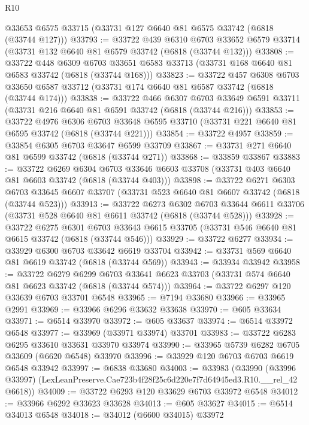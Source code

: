 \begin{lexlean}{R10}
\begin{coremodule}
    @33653
    @6575
    @33715
    (@33731 @127 @6640 @81 @6575 @33742 (@6818 (@33744 @127)))
@33793 := @33722
    @439
    @6310
    @6703
    @33652
    @6579
    @33714
    (@33731 @132 @6640 @81 @6579 @33742 (@6818 (@33744 @132)))
@33808 := @33722
    @448
    @6309
    @6703
    @33651
    @6583
    @33713
    (@33731 @168 @6640 @81 @6583 @33742 (@6818 (@33744 @168)))
@33823 := @33722
    @457
    @6308
    @6703
    @33650
    @6587
    @33712
    (@33731 @174 @6640 @81 @6587 @33742 (@6818 (@33744 @174)))
@33838 := @33722
    @466
    @6307
    @6703
    @33649
    @6591
    @33711
    (@33731 @216 @6640 @81 @6591 @33742 (@6818 (@33744 @216)))
@33853 := @33722
    @4976
    @6306
    @6703
    @33648
    @6595
    @33710
    (@33731 @221 @6640 @81 @6595 @33742 (@6818 (@33744 @221)))
@33854 := @33722 @4957
@33859 := @33854 @6305 @6703 @33647 @6599 @33709
@33867 := @33731 @271 @6640 @81 @6599 @33742 (@6818 (@33744 @271))
@33868 := @33859 @33867
@33883 := @33722
    @6269
    @6304
    @6703
    @33646
    @6603
    @33708
    (@33731 @403 @6640 @81 @6603 @33742 (@6818 (@33744 @403)))
@33898 := @33722
    @6271
    @6303
    @6703
    @33645
    @6607
    @33707
    (@33731 @523 @6640 @81 @6607 @33742 (@6818 (@33744 @523)))
@33913 := @33722
    @6273
    @6302
    @6703
    @33644
    @6611
    @33706
    (@33731 @528 @6640 @81 @6611 @33742 (@6818 (@33744 @528)))
@33928 := @33722
    @6275
    @6301
    @6703
    @33643
    @6615
    @33705
    (@33731 @546 @6640 @81 @6615 @33742 (@6818 (@33744 @546)))
@33929 := @33722 @6277
@33934 := @33929 @6300 @6703 @33642 @6619 @33704
@33942 := @33731 @569 @6640 @81 @6619 @33742 (@6818 (@33744 @569))
@33943 := @33934 @33942
@33958 := @33722
    @6279
    @6299
    @6703
    @33641
    @6623
    @33703
    (@33731 @574 @6640 @81 @6623 @33742 (@6818 (@33744 @574)))
@33964 := @33722 @6297 @120 @33639 @6703 @33701 @6548
@33965 := @7194 @33680
@33966 := @33965 @2991
@33969 := @33966 @6296 @33632 @33638
@33970 := @605 @33634
@33971 := @6514 @33970
@33972 := @605 @33637
@33974 := @6514 @33972 @6548
@33977 := @33969 (@33971 @33974) @33701
@33983 := @33722 @6283 @6295 @33610 @33631 @33970 @33974
@33990 := @33965 @5739 @6282 @6705 @33609 (@6620 @6548) @33970
@33996 := @33929 @120 @6703 @6703 @6619 @6548 @33942
@33997 := @6838 @33680
@34003 := @33983
    (@33990 (@33996 @33997) (LexLeanPreserve.Cae723b4f28f25c6d220e7f7d64945ed3.R10.__rel_42 @6618))
@34009 := @33722 @6293 @120 @33629 @6703 @33972 @6548
@34012 := @33966 @6292 @33623 @33628
@34013 := @605 @33627
@34015 := @6514 @34013 @6548
@34018 := @34012 (@6600 @34015) @33972

\end{coremodule}
\end{lexlean}
